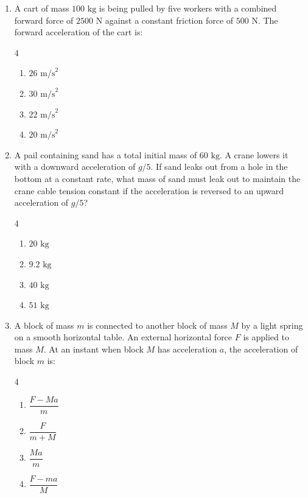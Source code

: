 \documentclass[11pt,a4paper]{article}
\begin{document}
\begin{enumerate}[label=\textbf{\arabic*.},leftmargin=18pt,itemsep=8pt,resume]
  \item A cart of mass $100\text{ kg}$ is being pulled by five workers with a combined forward force of $2500\text{ N}$ against a constant friction force of $500\text{ N}$. The forward acceleration of the cart is:
  \begin{multicols}{4}
    \begin{enumerate}[label=(\Alph*)]
      \item $26\text{ m/s}^2$
      \item $30\text{ m/s}^2$
      \item $22\text{ m/s}^2$
      \item $20\text{ m/s}^2$
    \end{enumerate}
  \end{multicols}

  \item A pail containing sand has a total initial mass of $60\text{ kg}$. A crane lowers it with a downward acceleration of $g/5$. If sand leaks out from a hole in the bottom at a constant rate, what mass of sand must leak out to maintain the crane cable tension constant if the acceleration is reversed to an upward acceleration of $g/5$?
  \begin{multicols}{4}
    \begin{enumerate}[label=(\Alph*)]
      \item $20\text{ kg}$
      \item $9.2\text{ kg}$
      \item $40\text{ kg}$
      \item $51\text{ kg}$
    \end{enumerate}
  \end{multicols}

  \item A block of mass $m$ is connected to another block of mass $M$ by a light spring on a smooth horizontal table. An external horizontal force $F$ is applied to mass $M$. At an instant when block $M$ has acceleration $a$, the acceleration of block $m$ is:
  \begin{multicols}{4}
    \begin{enumerate}[label=(\Alph*)]
      \item $\dfrac{F - Ma}{m}$
      \item $\dfrac{F}{m + M}$
      \item $\dfrac{Ma}{m}$
      \item $\dfrac{F - ma}{M}$
    \end{enumerate}
  \end{multicols}


\end{enumerate}
\end{document}
